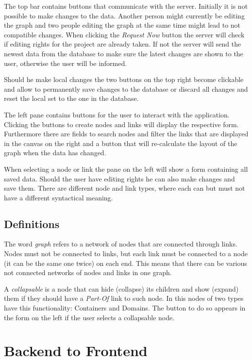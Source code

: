 The top bar contains buttons that communicate with the server. Initially it is not possible to make changes to the data. Another person might currently be editing the graph and two people editing the graph at the same time might lead to not compatible changes. When clicking the \emph{Request Now} button the server will check if editing rights for the project are already taken. If not the server will send the newest data from the database to make sure the latest changes are shown to the user, otherwise the user will be informed.

Should he make local changes the two buttons on the top right become clickable and allow to permanently save changes to the database or discard all changes and reset the local set to the one in the database.

The left pane contains buttons for the user to interact with the application. Clicking the buttons to create nodes and links will display the respective form.
Furthermore there are fields to search nodes and filter the links that are displayed in the canvas on the right and a button that will re-calculate the layout of the graph when the data has changed.

When selecting a node or link the pane on the left will show a form containing all saved data. Should the user have editing rights he can also make changes and save them. There are different node and link types, where each can but must not have a different syntactical meaning.

\section{Definitions}
The word \emph{graph} refers to a network of nodes that are connected through links. Nodes must not be connected to links, but each link must be connected to a node (it can be the same one twice) on each end. This means that there can be various not connected networks of nodes and links in one graph.

A \emph{collapsable} is a node that can hide (collapse) its children and show (expand) them if they should have a \emph{Part-Of} link to such node. In this nodes of two types have this functionality: Containers and Domains. The button to do so appears in the form on the left if the user selects a collapsable node.

\chapter{Backend to Frontend}

